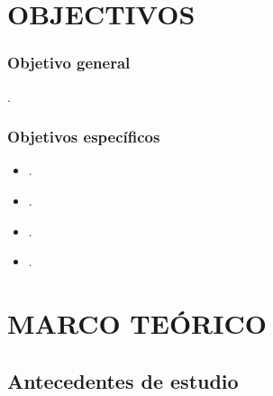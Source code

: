 \documentclass[12pt,a4paper]{article}
\begin{document}

\section{OBJECTIVOS}

\subsubsection{Objetivo general}
\objetivo.
\subsubsection{Objetivos específicos}
\begin{itemize}
	\item \objetivoe.
	\item \objetivoee.
	\item \objetivoeee.
	\item \objetivoeeee.
\end{itemize}


\section{MARCO TEÓRICO}

\subsection{Antecedentes de estudio}
\end{document}
